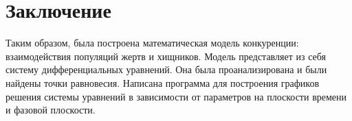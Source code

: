 \section{Заключение}
Таким образом, была построена математическая модель конкуренции: взаимодействия популяций жертв и хищников. Модель представляет из себя систему дифференциальных уравнений. Она была проанализирована и были найдены точки равновесия. Написана программа для построения графиков решения системы уравнений в зависимости от параметров на плоскости времени и фазовой плоскости.
